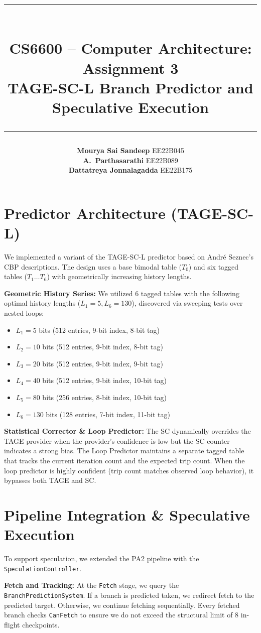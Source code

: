 \documentclass[11pt, a4paper]{article}
\title{
    \vspace{-0.5in}
    \rule{\linewidth}{1pt}\\[0.4cm]
    {\huge\textbf{CS6600 -- Computer Architecture: Assignment 3}}\\[0.15cm]
    {\Large TAGE-SC-L Branch Predictor and Speculative Execution}\\[0.1cm]
    \rule{\linewidth}{1pt}
}
\author{
    \textbf{Mourya Sai Sandeep} \quad EE22B045 \\[2pt]
    \textbf{A.\ Parthasarathi} \quad EE22B089 \\[2pt]
    \textbf{Dattatreya Jonnalagadda} \quad EE22B175
}
\date{}
\begin{document}
\maketitle


\section{Predictor Architecture (TAGE-SC-L)}

We implemented a variant of the TAGE-SC-L predictor based on André Seznec's CBP descriptions. The design uses a base bimodal table ($T_0$) and six tagged tables ($T_1 \dots T_6$) with geometrically increasing history lengths. 

\textbf{Geometric History Series:}
We utilized 6 tagged tables with the following optimal history lengths ($L_1 = 5, L_6 = 130$), discovered via sweeping tests over nested loops:
\begin{itemize}
    \item $L_1 = 5$ bits (512 entries, 9-bit index, 8-bit tag)
    \item $L_2 = 10$ bits (512 entries, 9-bit index, 8-bit tag)
    \item $L_3 = 20$ bits (512 entries, 9-bit index, 9-bit tag)
    \item $L_4 = 40$ bits (512 entries, 9-bit index, 10-bit tag)
    \item $L_5 = 80$ bits (256 entries, 8-bit index, 10-bit tag)
    \item $L_6 = 130$ bits (128 entries, 7-bit index, 11-bit tag)
\end{itemize}

\textbf{Statistical Corrector \& Loop Predictor:}
The SC dynamically overrides the TAGE provider when the provider's confidence is low but the SC counter indicates a strong bias. The Loop Predictor maintains a separate tagged table that tracks the current iteration count and the expected trip count. When the loop predictor is highly confident (trip count matches observed loop behavior), it bypasses both TAGE and SC.

\section{Pipeline Integration \& Speculative Execution}

To support speculation, we extended the PA2 pipeline with the \texttt{SpeculationController}.

\textbf{Fetch and Tracking:}
At the \texttt{Fetch} stage, we query the \texttt{BranchPredictionSystem}. If a branch is predicted taken, we redirect fetch to the predicted target. Otherwise, we continue fetching sequentially. Every fetched branch checks \texttt{CanFetch} to ensure we do not exceed the structural limit of 8 in-flight checkpoints.
\end{document}
